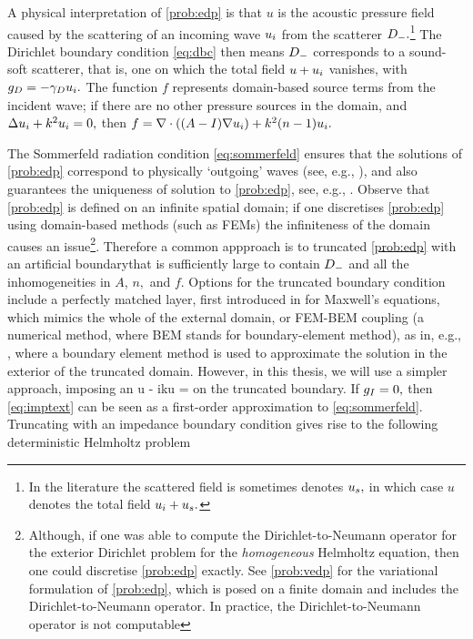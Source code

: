 A physical interpretation of \cref{prob:edp} is that $u$ is the acoustic pressure field caused by the scattering of an incoming wave $u_{i}$ from the scatterer $D_{-}.$\footnote{In the literature the scattered field is sometimes denotes $u_{s},$ in which case $u$ denotes the total field $u_{i}+ u_{s}.$} The Dirichlet boundary condition \eqref{eq:dbc} then means $D_{-}$ corresponds to a sound-soft scatterer, that is, one on which the total field $u + u_{i}$ vanishes, with $g_{D} = - \gamma_{D} u_{i}.$ The function $f$ represents domain-based source terms from the incident wave; if there are no other pressure sources in the domain, and $\Delta u_{i} + k^2 u_{i} = 0,$ then $f = \grad \cdot \mleft(\mleft(A-I\mright) \grad \ui\mright) + k^2 \mleft(n-1\mright)\ui.$

The Sommerfeld radiation condition \eqref{eq:sommerfeld} ensures that the solutions of \cref{prob:edp} correspond to physically `outgoing' waves (see, e.g., \cite[Section 1.1.3]{Ih:98}), and also guarantees the uniqueness of solution to \cref{prob:edp}, see, e.g., \cite[p. 16]{CoKr:13}. Observe that \cref{prob:edp} is defined on an infinite spatial domain; if one discretises \cref{prob:edp} using domain-based methods (such as FEMs) the infiniteness of the domain causes an issue\footnote{Although, if one was able to compute the Dirichlet-to-Neumann operator for the exterior Dirichlet problem for the \emph{homogeneous} Helmholtz equation, then one could discretise \cref{prob:edp} exactly. See \cref{prob:vedp} for the variational formulation of \cref{prob:edp}, which is posed on a finite domain and includes the Dirichlet-to-Neumann operator. In practice, the Dirichlet-to-Neumann operator is not computable}. Therefore a common appproach is to truncated \cref{prob:edp} with an artificial boundarythat is sufficiently large to contain $D_{-}$ and all the inhomogeneities in $A$, $n,$ and $f.$ Options for the truncated boundary condition include a perfectly matched layer, first introduced in \cite{Be:94} for Maxwell's equations, which mimics the whole of the external domain, or FEM-BEM coupling (a numerical method, where BEM stands for boundary-element method), as in, e.g., \cite{HiMe:06}, where a boundary element method is used to approximate the solution in the exterior of the truncated domain. However, in this thesis, we will use a simpler approach, imposing an 
\beq\label{eq:imptext}
\dn u - iku = \gI
\eeq
on the truncated boundary. If $g_{I} = 0,$ then \eqref{eq:imptext} can be seen as a first-order approximation to \eqref{eq:sommerfeld}. Truncating with an impedance boundary condition gives rise to the following deterministic Helmholtz problem
